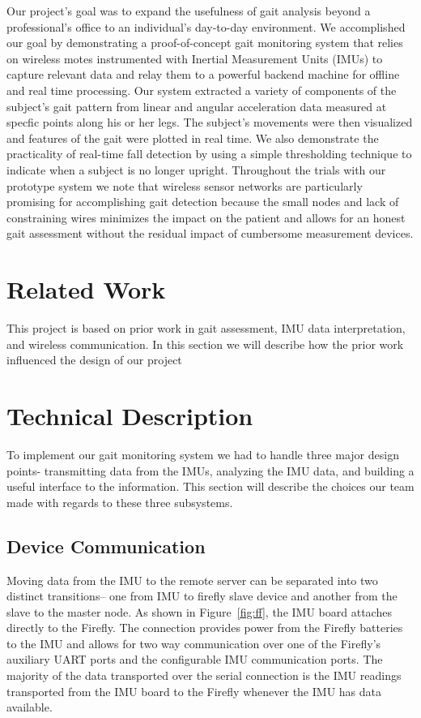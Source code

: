 \documentclass[conference]{IEEEtran}
\begin{document}
Our project's goal was to expand the usefulness of gait analysis beyond a professional’s
office to an individual’s day-to-day environment. We accomplished our goal by
demonstrating a proof-of-concept gait monitoring system that relies on wireless motes
instrumented with Inertial Measurement Units (IMUs) to capture relevant data and relay
them to a powerful backend machine for offline and real time processing. Our system
extracted a variety of components of the subject's gait pattern from linear and angular
acceleration data measured at specfic points along his or her legs. The subject's
movements were then visualized and features of the gait were plotted in real time. We also
demonstrate the practicality of real-time fall detection by using a simple thresholding
technique to indicate when a subject is no longer upright. Throughout the trials with our
prototype system we note that wireless sensor networks are particularly promising for
accomplishing gait detection because the small nodes and lack of constraining wires
minimizes the impact on the patient and allows for an honest gait assessment without the
residual impact of cumbersome measurement devices. 
%
%
\section{Related Work}
This project is based on prior work in gait assessment, IMU data interpretation, and
wireless communication. In this section we will describe how the prior work influenced the
design of our project 

\section{Technical Description}
To implement our gait monitoring system we had to handle three major design points-
transmitting data from the IMUs, analyzing the IMU data, and building a useful interface
to the information. This section will describe the choices our team made with regards to
these three subsystems. 
\subsection{Device Communication}
Moving data from the IMU to the remote server can be separated into two distinct
transitions-- one from IMU to firefly slave device and another from the slave to the
master node. As shown in Figure~\ref{fig:ff}, the IMU board attaches directly to the
Firefly. The connection provides power from the Firefly batteries to the IMU and allows
for two way communication over one of the Firefly's auxiliary UART ports and the
configurable IMU communication ports. The majority of the data transported over the serial
connection is the IMU readings transported from the IMU board to the Firefly whenever the
IMU has data available. 
\end{document}
